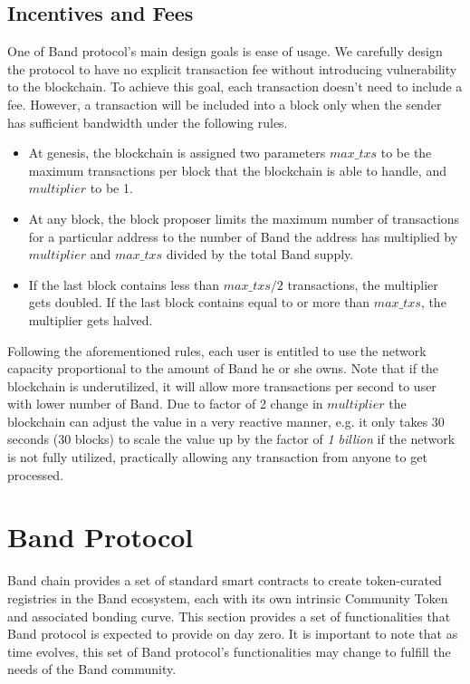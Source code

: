 \documentclass[letterpaper,11pt]{article}
\begin{document}
\subsection{Incentives and Fees}
One of Band protocol's main design goals is ease of usage. We carefully design the protocol to have no explicit transaction fee without introducing vulnerability to the blockchain. To achieve this goal, each transaction doesn't need to include a fee. However, a transaction will be included into a block only when the sender has sufficient bandwidth under the following rules. 

\begin{itemize}
\setlength\itemsep{0em}
\item At genesis, the blockchain is assigned two parameters $max\_txs$ to be the maximum transactions per block that the blockchain is able to handle, and $multiplier$ to be 1. 
\item At any block, the block proposer limits the maximum number of transactions for a particular address to the number of Band the address has multiplied by $multiplier$ and $max\_txs$ divided by the total Band supply.
\item If the last block contains less than $max\_txs / 2$ transactions, the multiplier gets doubled. If the last block contains equal to or more than $max\_txs$, the multiplier gets halved.
\end{itemize}

Following the aforementioned rules, each user is entitled to use the network capacity proportional to the amount of Band he or she owns. Note that if the blockchain is underutilized, it will allow more transactions per second to user with lower number of Band. Due to factor of 2 change in $multiplier$ the blockchain can adjust the value in a very reactive manner, e.g. it only takes 30 seconds (30 blocks) to scale the value up by the factor of \emph{1 billion} if the network is not fully utilized, practically allowing any transaction from anyone to get processed.

\newpage

\section{Band Protocol} \label{sec:band-protocol}
Band chain provides a set of standard smart contracts to create token-curated registries in the Band ecosystem, each with its own intrinsic Community Token and associated bonding curve. This section provides a set of functionalities that Band protocol is expected to provide on day zero. It is important to note that as time evolves, this set of Band protocol’s functionalities may change to fulfill the needs of the Band community. 
\end{document}
